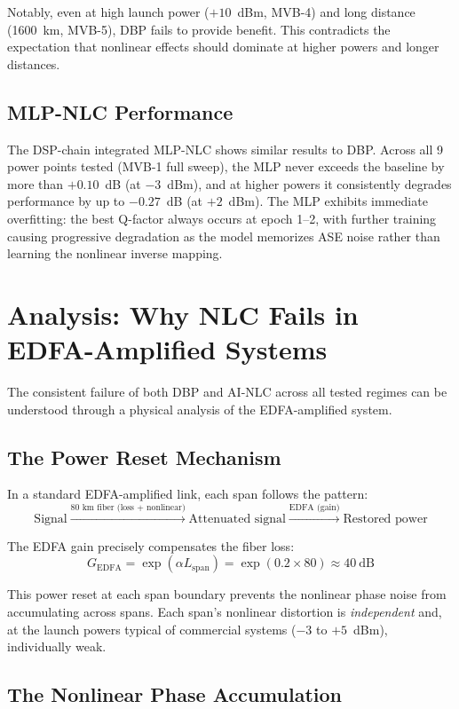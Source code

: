 \documentclass[conference]{IEEEtran}
\begin{document}
Notably, even at high launch power ($+10$~dBm, MVB-4) and long distance (1600~km, MVB-5), DBP fails to provide benefit. This contradicts the expectation that nonlinear effects should dominate at higher powers and longer distances.

\subsection{MLP-NLC Performance}

The DSP-chain integrated MLP-NLC shows similar results to DBP. Across all 9 power points tested (MVB-1 full sweep), the MLP never exceeds the baseline by more than $+0.10$~dB (at $-3$~dBm), and at higher powers it consistently degrades performance by up to $-0.27$~dB (at $+2$~dBm). The MLP exhibits immediate overfitting: the best Q-factor always occurs at epoch 1--2, with further training causing progressive degradation as the model memorizes ASE noise rather than learning the nonlinear inverse mapping.

\section{Analysis: Why NLC Fails in EDFA-Amplified Systems}

The consistent failure of both DBP and AI-NLC across all tested regimes can be understood through a physical analysis of the EDFA-amplified system.

\subsection{The Power Reset Mechanism}

In a standard EDFA-amplified link, each span follows the pattern:
\[
\text{Signal} \xrightarrow{\text{80 km fiber (loss + nonlinear)}} \text{Attenuated signal} \xrightarrow{\text{EDFA (gain)}} \text{Restored power}
\]

The EDFA gain precisely compensates the fiber loss:
\[
G_{\text{EDFA}} = \exp(\alpha L_{\text{span}}) = \exp(0.2 \times 80) \approx 40~\text{dB}
\]

This power reset at each span boundary prevents the nonlinear phase noise from accumulating across spans. Each span's nonlinear distortion is \textit{independent} and, at the launch powers typical of commercial systems ($-3$ to $+5$~dBm), individually weak.

\subsection{The Nonlinear Phase Accumulation}
\end{document}
